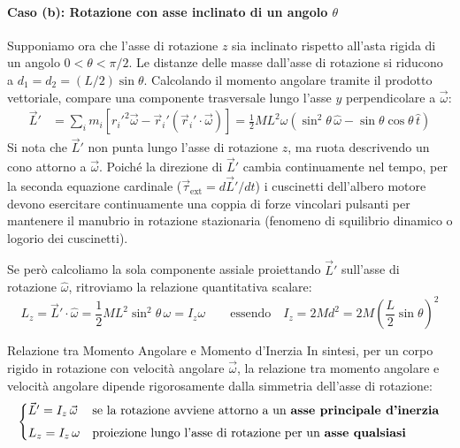 \paragraph{Caso (b): Rotazione con asse inclinato di un angolo $\theta$}
Supponiamo ora che l'asse di rotazione $z$ sia inclinato rispetto all'asta rigida di un angolo $0 < \theta < \pi/2$. Le distanze delle masse dall'asse di rotazione si riducono a $d_1 = d_2 = (L/2)\sin\theta$. 
Calcolando il momento angolare tramite il prodotto vettoriale, compare una componente trasversale lungo l'asse $y$ perpendicolare a $\vec{\omega}$:
\begin{align*}
    \vec{L}' &= \sum_i m_i \left[ {r_i'}^2 \vec{\omega} - \vec{r}_i'(\vec{r}_i' \cdot \vec{\omega}) \right] = \frac{1}{2} M L^2 \omega \left( \sin^2\theta \, \hat{\omega} - \sin\theta \cos\theta \, \hat{t} \right)
\end{align*}
Si nota che $\vec{L}'$ non punta lungo l'asse di rotazione $z$, ma ruota descrivendo un cono attorno a $\vec{\omega}$. Poiché la direzione di $\vec{L}'$ cambia continuamente nel tempo, per la seconda equazione cardinale ($\vec{\tau}_{\text{ext}} = d\vec{L}'/dt$) i cuscinetti dell'albero motore devono esercitare continuamente una coppia di forze vincolari pulsanti per mantenere il manubrio in rotazione stazionaria (fenomeno di squilibrio dinamico o logorio dei cuscinetti).

Se però calcoliamo la sola componente assiale proiettando $\vec{L}'$ sull'asse di rotazione $\hat{\omega}$, ritroviamo la relazione quantitativa scalare:
\begin{equation}
    L_z = \vec{L}' \cdot \hat{\omega} = \frac{1}{2} M L^2 \sin^2\theta \, \omega = I_z \omega \qquad \text{essendo} \quad I_z = 2M d^2 = 2M\left( \frac{L}{2}\sin\theta \right)^2
\end{equation}

\begin{osservazione}{Relazione tra Momento Angolare e Momento d'Inerzia}
In sintesi, per un corpo rigido in rotazione con velocità angolare $\vec{\omega}$, la relazione tra momento angolare e velocità angolare dipende rigorosamente dalla simmetria dell'asse di rotazione:
\begin{equation}
\begin{cases}
    \vec{L}' = I_z \, \vec{\omega} & \text{se la rotazione avviene attorno a un \textbf{asse principale d'inerzia}} \\[4pt]
    L_z = I_z \, \omega & \text{proiezione lungo l'asse di rotazione per un \textbf{asse qualsiasi}}
\end{cases}
\end{equation}
\end{osservazione}


